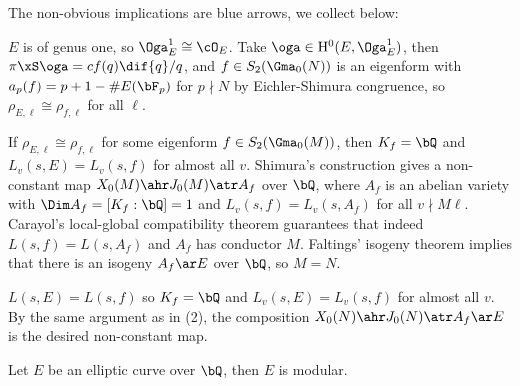 \documentclass[article, a4paper, twoside]{universal}
\begin{document}
\begin{prf}
	The non-obvious implications are blue arrows, we collect below:

	\begin{enr}[label = (\arabic*)]
		\item $E$ is of genus one, so $\Oga_{E}^{1}\cong\cO_{E}$. Take $\oga\in \mathrm{H}_{}^{0}(E,\Oga_{E}^{1})$, then $\pi\xS\oga=cf(q)\dif{q}/q$, and $f\in S_{2}(\Gma_{0}(N))$ is an eigenform with $a_{p}(f)=p+1-\#E(\bF_{p})$ for $p\nmid N$ by Eichler-Shimura congruence, so $\rho_{E,\ell}\cong\rho_{f,\ell}$ for all $\ell$.
		\item If $\rho_{E,\ell}\cong\rho_{f,\ell}$ for some eigenform $f\in S_{2}(\Gma_{0}(M))$, then $K_{f}=\bQ$ and $L_{v}(s,E)=L_{v}(s,f)$ for almost all $v$. Shimura's construction\cite[7.14]{Shimura1971AF} gives a non-constant map $X_{0}(M)\ahr J_{0}(M)\atr A_{f}$ over $\bQ$, where $A_{f}$ is an abelian variety with $\Dim A_{f}=[K_{f}:\bQ]=1$ and $L_{v}(s,f)=L_{v}(s,A_{f})$ for all $v\nmid M\ell$. Carayol's local-global compatibility theorem\cite[0.8]{Carayol1986Representations} guarantees that indeed $L(s,f)=L(s,A_{f})$ and $A_{f}$ has conductor $M$. Faltings' isogeny theorem\cite[Page~361]{Faltings1983Mordell} implies that there is an isogeny $A_{f}\ar E$ over $\bQ$, so $M=N$.
		\item $L(s,E)=L(s,f)$ so $K_{f}=\bQ$ and $L_{v}(s,E)=L_{v}(s,f)$ for almost all $v$. By the same argument as in (2), the composition $X_{0}(N)\ahr J_{0}(N)\atr A_{f}\ar E$ is the desired non-constant map.
	\end{enr}
\end{prf}

\begin{thm}
	Let $E$ be an elliptic curve over $\bQ$, then $E$ is modular.
\end{thm}
\end{document}
